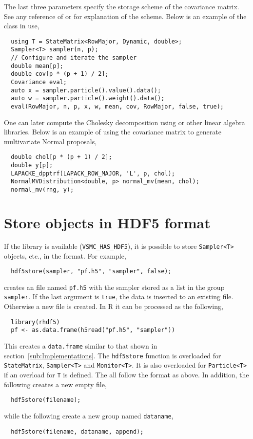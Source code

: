 The last three parameters specify the storage scheme of the covariance matrix.
See any reference of \blas or \lapack for explanation of the scheme. Below is
an example of the class in use,
\begin{Verbatim}
  using T = StateMatrix<RowMajor, Dynamic, double>;
  Sampler<T> sampler(n, p);
  // Configure and iterate the sampler
  double mean[p];
  double cov[p * (p + 1) / 2];
  Covariance eval;
  auto x = sampler.particle().value().data();
  auto w = sampler.particle().weight().data();
  eval(RowMajor, n, p, x, w, mean, cov, RowMajor, false, true);
\end{Verbatim}
One can later compute the Cholesky decomposition using \lapack or other linear
algebra libraries. Below is an example of using the covariance matrix to
generate multivariate Normal proposals,
\begin{Verbatim}
  double chol[p * (p + 1) / 2];
  double y[p];
  LAPACKE_dpptrf(LAPACK_ROW_MAJOR, 'L', p, chol);
  NormalMVDistribution<double, p> normal_mv(mean, chol);
  normal_mv(rng, y);
\end{Verbatim}

\section{Store objects in HDF5 format}
\label{sec:Store objects in HDF5 format}

If the \hdf library is available (\verb|VSMC_HAS_HDF5|), it is possible to
store \verb|Sampler<T>| objects, etc., in the \hdf format. For example,
\begin{Verbatim}
  hdf5store(sampler, "pf.h5", "sampler", false);
\end{Verbatim}
creates an \hdf file named \verb|pf.h5| with the sampler stored as a list in
the group \verb|sampler|. If the last argument is \verb|true|, the data is
inserted to an existing file. Otherwise a new file is created. In R it can be
processed as the following,
\begin{Verbatim}
  library(rhdf5)
  pf <- as.data.frame(h5read("pf.h5", "sampler"))
\end{Verbatim}
This creates a \verb|data.frame| similar to that shown in
section~\ref{sub:Implementations}. The \verb|hdf5store| function is overloaded
for \verb|StateMatrix|, \verb|Sampler<T>| and \verb|Monitor<T>|. It is also
overloaded for \verb|Particle<T>| if an overload for \verb|T| is defined. The
all follow the format as above. In addition, the following creates a new empty
\hdf file,
\begin{Verbatim}
  hdf5store(filename);
\end{Verbatim}
while the following create a new group named \verb|dataname|,
\begin{Verbatim}
  hdf5store(filename, dataname, append);
\end{Verbatim}

